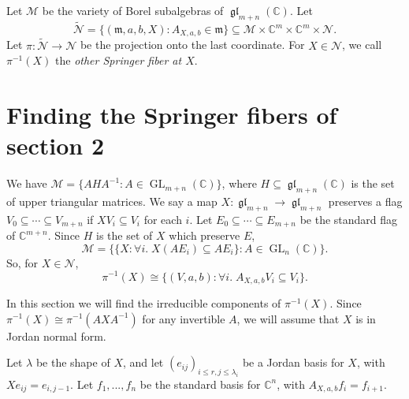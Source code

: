 \documentclass[12pt,psamsfonts]{article}
\DeclareMathOperator{\GL}{GL}
\DeclareMathOperator{\gl}{\mathfrak{gl}}
\begin{document}
Let \(\mathcal{M}\) be the variety of Borel subalgebras of \(\gl_{m + n}(\mathbb{C})\).
Let
\[\widetilde{\mathcal{N}} = \{(\mathfrak{m}, a, b, X) : A_{X, a, b} \in \mathfrak{m}\} \subseteq \mathcal{M} \times \mathbb{C}^m \times \mathbb{C}^m \times \mathcal{N}.\]
Let \(\pi : \widetilde{\mathcal{N}} \to \mathcal{N}\) be the projection onto the last coordinate.
For \(X \in \mathcal{N}\), we call \(\pi^{-1}(X)\) the \emph{other Springer fiber at \(X\)}.
\section{Finding the Springer fibers of section 2}
We have \(\mathcal{M} = \{AHA^{-1} : A \in \GL_{m + n}(\mathbb{C})\}\), where \(H \subseteq \gl_{m + n}(\mathbb{C})\) is the set of upper triangular matrices.
We say a map \(X : \gl_{m + n} \to \gl_{m + n}\) preserves a flag \(V_0 \subseteq \cdots \subseteq V_{m + n}\) if \(XV_i \subseteq V_i\) for each \(i\).
Let \(E_0 \subseteq \cdots \subseteq E_{m + n}\) be the standard flag of \(\mathbb{C}^{m + n}\).
Since \(H\) is the set of \(X\) which preserve \(E\),
\[\mathcal{M} = \{\{X : \forall i. \; X(AE_i) \subseteq AE_i\} : A \in \GL_n(\mathbb{C})\}.\]
So, for \(X \in \mathcal{N}\),
\[\pi^{-1}(X) \cong \{(V, a, b) : \forall i. \; A_{X, a, b} V_i \subseteq V_i\}.\]
\par In this section we will find the irreducible components of \(\pi^{-1}(X)\).
Since \(\pi^{-1}(X) \cong \pi^{-1}(AXA^{-1})\) for any invertible \(A\), we will assume that \(X\) is in Jordan normal form.
\par Let \(\lambda\) be the shape of \(X\), and let \((e_{ij})_{i \leq r, j \leq \lambda_i}\) be a Jordan basis for \(X\), with \(X e_{ij} = e_{i,j - 1}\).
Let \(f_1, ..., f_n\) be the standard basis for \(\mathbb{C}^n\), with \(A_{X, a, b} f_i = f_{i + 1}\).
\end{document}
